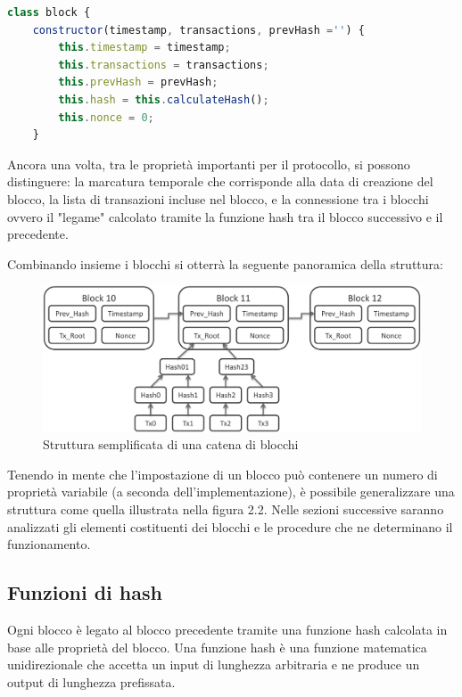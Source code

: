 \begin{lstlisting}[caption={Esempio di struttura di un blocco},language=JavaScript]
class block {
    constructor(timestamp, transactions, prevHash ='') {
        this.timestamp = timestamp;
        this.transactions = transactions;
        this.prevHash = prevHash;
        this.hash = this.calculateHash();
        this.nonce = 0;
    }
\end{lstlisting}

Ancora una volta, tra le proprietà importanti per il protocollo, si possono distinguere: la marcatura temporale che corrisponde alla data di creazione del blocco, la lista di transazioni incluse nel blocco, e la connessione tra i blocchi ovvero il "legame" calcolato tramite la funzione hash tra il blocco successivo e il precedente.

Combinando insieme i blocchi si otterrà la seguente panoramica della struttura:

\begin{figure}[H]
\centering
\includegraphics[width=1\textwidth]{immagini/bitcoinblocks.png}
\caption{Struttura semplificata di una catena di blocchi}
\label{fig:ConcettoStrutturaBlocchi}

\end{figure}

Tenendo in mente che l'impostazione di un blocco può contenere un numero di proprietà variabile (a seconda dell'implementazione), è possibile generalizzare una struttura come quella illustrata nella figura 2.2. Nelle sezioni successive saranno analizzati gli elementi costituenti dei blocchi e le procedure che ne determinano il funzionamento.

\subsection{Funzioni di hash}

Ogni blocco è legato al blocco precedente tramite una funzione hash calcolata in base alle proprietà del blocco. Una funzione hash è una funzione matematica unidirezionale che accetta un input di lunghezza arbitraria e ne produce un output di lunghezza prefissata.

